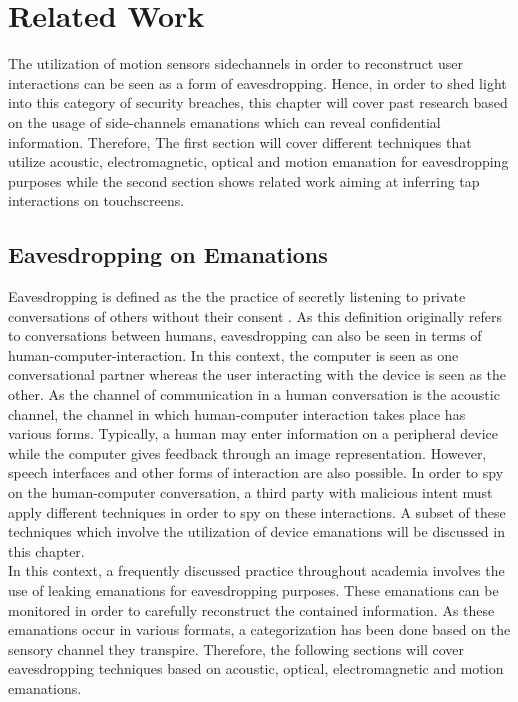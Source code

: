 \chapter{Related Work\label{cha:chapter2}}
The utilization of motion sensors sidechannels in order to reconstruct user interactions can be seen as a form of eavesdropping. Hence, in order to shed light into this category of security breaches, this chapter will cover past research based on the usage of side-channels emanations which can reveal confidential information. Therefore, The first section will cover different techniques that utilize acoustic, electromagnetic, optical and motion emanation for eavesdropping purposes while the second section shows related work aiming at inferring tap interactions on touchscreens.

\section{Eavesdropping on Emanations}

Eavesdropping is defined as the the practice of secretly listening to private conversations of others without their consent \cite{black1990black}. As this definition originally refers to conversations between humans, eavesdropping can also be seen in terms of human-computer-interaction. In this context, the computer is seen as one conversational partner whereas the user interacting with the device is seen as the other. As the channel of communication in a human conversation is the acoustic channel, the channel in which human-computer interaction takes place has various forms. Typically, a human may enter information on a peripheral device while the computer gives feedback through an image representation. However, speech interfaces and other forms of interaction are also possible. In order to spy on the human-computer conversation, a third party with malicious intent must apply different techniques in order to spy on these interactions. A subset of these techniques which involve the utilization of device emanations will be discussed in this chapter.\\

In this context, a frequently discussed practice throughout academia involves the use of leaking emanations for eavesdropping purposes. These emanations can be monitored in order to carefully reconstruct the contained information. As these emanations occur in various formats, a categorization has been done based on the sensory channel they transpire. Therefore, the following sections will cover eavesdropping techniques based on acoustic, optical, electromagnetic and motion emanations.

